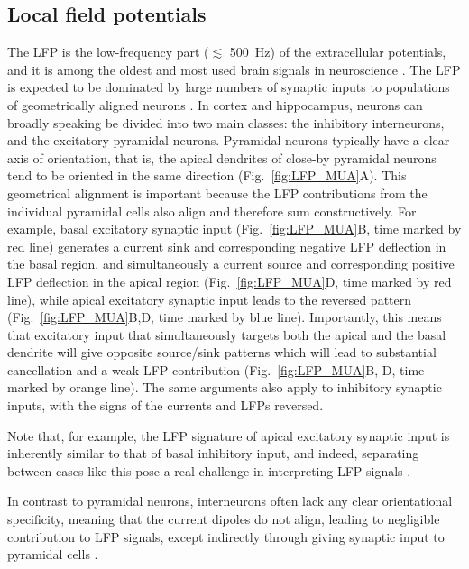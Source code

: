 \documentclass[preprint,11pt,authoryear]{elsarticle}
\newcommand{\hlj}[2][OliveGreen]{ {\sethlcolor{#1} \hl{#2}} }
\newcommand{\tvnnote}[1]{\color{white}{\hlj{TVN: #1 }}\color{black}}
\begin{document}
\subsection{Local field potentials}
The LFP is the low-frequency part ($\lesssim$ 500~Hz) of the extracellular potentials, and it is among the oldest and most used brain signals in neuroscience \citep{Einevoll2013}. The LFP is expected to be dominated by large numbers of synaptic inputs to populations of geometrically aligned neurons \citep{Nunez2006, Linden2011, Einevoll2013b}.
In cortex and hippocampus, neurons can broadly speaking be divided into two main classes: the inhibitory interneurons, and the excitatory pyramidal neurons. Pyramidal neurons typically have a clear axis of orientation, that is, the apical dendrites of close-by pyramidal neurons tend to be oriented in the same direction (Fig.~\ref{fig:LFP_MUA}A). This geometrical alignment is important because the LFP contributions from the individual pyramidal cells also align and therefore sum constructively.  For example, basal excitatory synaptic input (Fig.~\ref{fig:LFP_MUA}B, time marked by red line) generates a current sink and corresponding negative LFP deflection in the basal region, and simultaneously a current source and corresponding positive LFP deflection in the apical region (Fig.~\ref{fig:LFP_MUA}D, time marked by red line), while apical excitatory synaptic input leads to the reversed pattern (Fig.~\ref{fig:LFP_MUA}B,D, time marked by blue line). 
Importantly, this means that excitatory input that simultaneously targets both the apical and the basal dendrite will give opposite source/sink patterns which will lead to substantial cancellation and a weak LFP contribution (Fig.~\ref{fig:LFP_MUA}B, D, time marked by orange line).
The same arguments also apply to inhibitory synaptic inputs, with the signs of the currents and LFPs reversed. 

Note that, for example, the LFP signature of apical excitatory synaptic input is inherently similar to that of basal inhibitory input, and indeed, separating between cases like this pose a real challenge in interpreting LFP signals \citep{Linden2010}. 

In contrast to pyramidal neurons, interneurons often lack any clear orientational specificity, meaning that the current dipoles do not align, leading to negligible contribution to LFP signals, except indirectly through giving synaptic input to pyramidal cells \citep{Telenczuk2016, Hagen2016}.
\end{document}
